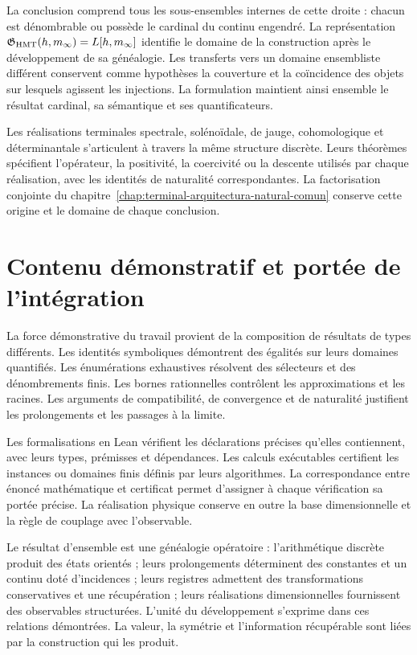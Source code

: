 La conclusion comprend tous les sous-ensembles internes de cette droite : chacun est dénombrable ou possède le cardinal du continu engendré. La représentation \(\mathfrak G_{\rm HMT}(h,m_\infty)=L[h,m_\infty]\) identifie le domaine de la construction après le développement de sa généalogie. Les transferts vers un domaine ensembliste différent conservent comme hypothèses la couverture et la coïncidence des objets sur lesquels agissent les injections. La formulation maintient ainsi ensemble le résultat cardinal, sa sémantique et ses quantificateurs.

Les réalisations terminales spectrale, solénoïdale, de jauge, cohomologique et déterminantale s’articulent à travers la même structure discrète. Leurs théorèmes spécifient l’opérateur, la positivité, la coercivité ou la descente utilisés par chaque réalisation, avec les identités de naturalité correspondantes. La factorisation conjointe du chapitre~\ref{chap:terminal-arquitectura-natural-comun} conserve cette origine et le domaine de chaque conclusion.

\section{Contenu démonstratif et portée de l’intégration}

La force démonstrative du travail provient de la composition de résultats de types différents. Les identités symboliques démontrent des égalités sur leurs domaines quantifiés. Les énumérations exhaustives résolvent des sélecteurs et des dénombrements finis. Les bornes rationnelles contrôlent les approximations et les racines. Les arguments de compatibilité, de convergence et de naturalité justifient les prolongements et les passages à la limite.

Les formalisations en Lean vérifient les déclarations précises qu’elles contiennent, avec leurs types, prémisses et dépendances. Les calculs exécutables certifient les instances ou domaines finis définis par leurs algorithmes. La correspondance entre énoncé mathématique et certificat permet d’assigner à chaque vérification sa portée précise. La réalisation physique conserve en outre la base dimensionnelle et la règle de couplage avec l’observable.

Le résultat d’ensemble est une généalogie opératoire : l’arithmétique discrète produit des états orientés ; leurs prolongements déterminent des constantes et un continu doté d’incidences ; leurs registres admettent des transformations conservatives et une récupération ; leurs réalisations dimensionnelles fournissent des observables structurées. L’unité du développement s’exprime dans ces relations démontrées. La valeur, la symétrie et l’information récupérable sont liées par la construction qui les produit.
